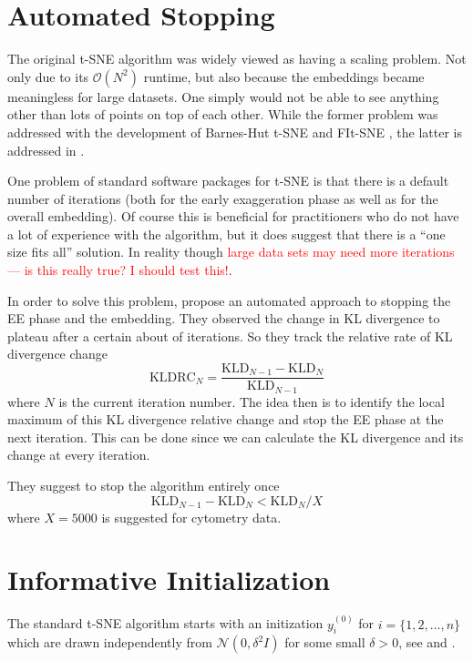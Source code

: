 
\section{Automated Stopping}
The original t-SNE algorithm was widely viewed as having a scaling problem. Not only due to its $\mathcal{O}(N^2)$ runtime, but also because the embeddings became meaningless for large datasets. 
One simply would not be able to see anything other than lots of points on top of each other. 
While the former problem was addressed with the development of Barnes-Hut t-SNE \cite{vdMaa14} and FIt-SNE \cite{Lin19}, the latter is addressed in \cite{belkina19}. 

One problem of standard software packages for t-SNE is that there is a default number of iterations (both for the early exaggeration phase as well as for the overall embedding). 
Of course this is beneficial for practitioners who do not have a lot of experience with the algorithm, but it does suggest that there is a \enquote{one size fits all} solution. 
In reality though \textcolor{red}{large data sets may need more iterations --- is this really true? I should test this!}. 

In order to solve this problem, \cite{belkina19} propose an automated approach to stopping the EE phase and the embedding. 
They observed the change in KL divergence to plateau after a certain about of iterations. 
So they track the relative rate of KL divergence change \begin{equation}\text{KLDRC}_N = \frac{\text{KLD}_{N-1} - \text{KLD}_N}{\text{KLD}_{N-1}}
\end{equation} where $N$ is the current iteration number. 
The idea then is to identify the local maximum of this KL divergence relative change and stop the EE phase at the next iteration. 
This can be done since we can calculate the KL divergence and its change at every iteration. 

They suggest to stop the algorithm entirely once 
\begin{equation}
  \text{KLD}_{N-1} - \text{KLD}_{N} < \text{KLD}_N / X 
\end{equation}
where $X=5000$ is suggested for cytometry data. 

\section{Informative Initialization}
The standard t-SNE algorithm starts with an initization $y_i^{(0)}$ for $i=\{1, 2, \dots, n\}$ which are drawn independently from $\mathcal{N}(0, \delta^2 I)$ for some small $\delta > 0$, see \cite{vdMaa08} and \cite{vdMaa14}. 

